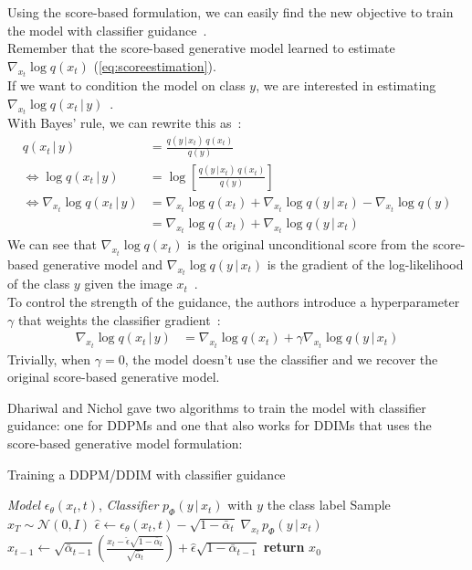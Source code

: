 \documentclass[twoside]{article}
\numberwithin{equation}{section}
\numberwithin{figure}{section}
\begin{document}
Using the score-based formulation, we can easily find the new objective to train the model with classifier guidance~\cite{luo2022understanding}. \\
Remember that the score-based generative model learned to estimate $\nabla_{x_t} \log q(x_t)$ (\ref{eq:scoreestimation}). \\
If we want to condition the model on class $y$, we are interested in estimating $\nabla_{x_t} \log q(x_t \, | \, y)$~\cite{luo2022understanding}. \\
With Bayes' rule, we can rewrite this as~\cite{luo2022understanding}:
\begin{align}
  q(x_t \, | \, y) &= \frac{q(y \, | \, x_t) \, q(x_t)}{q(y)}\\
  \Leftrightarrow \log q(x_t \, | \, y) &= \log \left[ \frac{q(y \, | \, x_t) \, q(x_t)}{q(y)} \right] \\
  \Leftrightarrow \nabla_{x_t} \log q(x_t \, | \, y) &= \nabla_{x_t} \log q(x_t) + \nabla_{x_t} \log q(y \, | \, x_t) - \nabla_{x_t} \log q(y) \\
  &= \nabla_{x_t} \log q(x_t) + \nabla_{x_t} \log q(y \, | \, x_t)
\end{align}
We can see that $\nabla_{x_t} \log q(x_t)$ is the original unconditional score from the score-based generative model and $\nabla_{x_t} \log q(y \, | \, x_t)$ is the gradient of the log-likelihood of the class $y$ given the image $x_t$~\cite{dhariwal2021diffusion, luo2022understanding}. \\
To control the strength of the guidance, the authors introduce a hyperparameter $\gamma$ that weights the classifier gradient~\cite{dhariwal2021diffusion,luo2022understanding}:
\begin{align}
  \nabla_{x_t} \log q(x_t \, | \, y) &= \nabla_{x_t} \log q(x_t) + \gamma \nabla_{x_t} \log q(y \, | \, x_t) \label{eq:classifier_guidance}
\end{align}
Trivially, when $\gamma = 0$, the model doesn't use the classifier and we recover the original score-based generative model.

Dhariwal and Nichol \cite{dhariwal2021diffusion} gave two algorithms to train the model with classifier guidance: one for DDPMs and one that also works for DDIMs that uses the score-based generative model formulation:
\begin{algorithm}[H]
  \centering
  \caption{Training a DDPM/DDIM with classifier guidance}\label{alg:ddpm_classifier}
  \begin{algorithmic}[1]
    \Require \textit{Model} $\epsilon_\theta (x_t, t)$, \textit{Classifier} $p_\Phi (y \, | \, x_t)$ with $y$ the class label
    \State Sample $x_T \sim \mathcal{N}(0, I)$
      \State $\hat{\epsilon} \leftarrow \epsilon_\theta (x_t, t) - \sqrt{1 - \bar{\alpha}_t} \; \nabla_{x_t} \, p_\Phi (y \, | \, x_t)$
      \State $x_{t-1} \leftarrow \sqrt{\bar{\alpha}_{t-1}} \left( \frac{x_t - \hat{\epsilon} \sqrt{1 - \bar{\alpha}_t}}{\sqrt{\bar{\alpha}_t}} \right) + \hat{\epsilon} \sqrt{1 - \bar{\alpha}_{t-1}}$
    \EndFor
    \State \textbf{return} $x_0$
  \end{algorithmic}
\end{algorithm}
\end{document}
